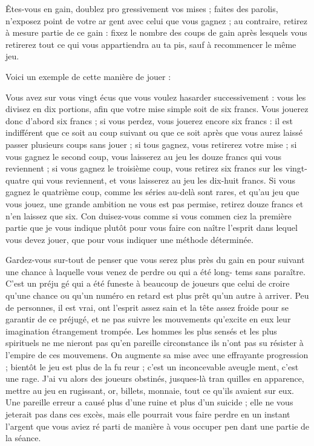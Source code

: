 Êtes-vous en gain, doublez pro%
gressivement vos mises ; faites des
parolis, n'exposez point de votre ar%
gent avec celui que vous gagnez ; au
contraire, retirez à mesure partie de
ce gain : fixez le nombre des coups
de gain après lesquels vous retirerez
tout ce qui vous appartiendra au ta%
pis, sauf à recommencer le même
jeu.

Voici un exemple de cette manière
de jouer :

Vous avez sur vous vingt écus que
vous voulez hasarder successivement :
vous les divisez en dix portions, afin
que votre mise simple soit de six
francs. Vous jouerez donc d'abord six
francs ; si vous perdez, vous jouerez
encore six francs : il est indifférent
que ce soit au coup suivant ou que
ce soit après que vous aurez laissé
passer plusieurs coups sans jouer ;
si tous gagnez, vous retirerez votre
mise ; si vous gagnez le second coup,
vous laisserez au jeu les douze francs
qui vous reviennent ; si vous gagnez
le troisième coup, vous retirez six
francs sur les vingt-quatre qui vous
reviennent, et vous laisserez au jeu
les dix-huit francs. Si vous gagnez
le quatrième coup, comme les séries
au-delà sont rares, et qu'au jeu que
vous jouez, une grande ambition ne
vous est pas permise, retirez douze
francs et n'en laissez que six. Con%
duisez-vous comme si vous commen%
ciez la première partie que je vous
indique plutôt pour vous faire con%
naître l'esprit dans lequel vous devez
jouer, que pour vous indiquer une
méthode déterminée.

Gardez-vous sur-tout de penser que
vous serez plus près du gain en pour%
suivant une chance à laquelle vous
venez de perdre ou qui a été long-%
tems sans paraître. C'est un préju%
gé qui a été funeste à beaucoup de
joueurs que celui de croire qu'une
chance ou qu'un numéro en retard
est plus prêt qu'un autre à arriver.
Peu de personnes, il est vrai, ont
l'esprit assez sain et la tête assez froide
pour se garantir de ce préjugé, et ne
pas suivre les mouvements qu'excite
en eux leur imagination étrangement
trompée. Les hommes les plus sensés
et les plus spirituels ne me nieront
pas qu'en pareille circonstance ils
n'ont pas su résister à l'empire de ces
mouvemens. On augmente sa mise
avec une effrayante progression ;
bientôt le jeu est plus de la fu%
reur ; c'est un inconcevable aveugle%
ment, c'est une rage. J'ai vu alors des
joueurs obstinés, jusques-là tran%
quilles en apparence, mettre au jeu
en rugissant, or, billets, monnaie,
tout ce qu'ils avaient sur eux. Une
pareille erreur a causé plus d'une
ruine et plus d'un suicide ; elle ne
vous jeterait pas dans ces excès, mais
elle pourrait vous faire perdre en un
instant l'argent que vous aviez ré%
parti de manière à vous occuper pen%
dant une partie de la séance.

